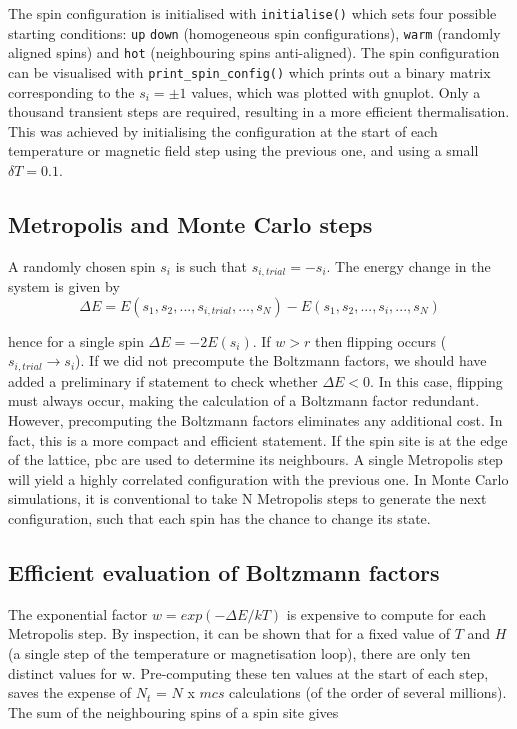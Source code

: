 \documentclass[a4paper]{article}
\begin{document}
The spin configuration is initialised with \verb;initialise(); which sets four possible starting conditions: \verb;up;  \verb;down; (homogeneous spin configurations), \verb;warm; (randomly aligned spins) and \verb;hot; (neighbouring spins anti-aligned). The spin configuration can be visualised with \verb;print_spin_config(); which prints out a binary matrix corresponding to the $s_i = \pm 1$ values, which was plotted with gnuplot. Only a thousand transient steps are required, resulting in a more efficient thermalisation. This was achieved by initialising the configuration at the start of each temperature or magnetic field step using the previous one, and using a small $\delta T = 0.1$.

\subsection{Metropolis and Monte Carlo steps }


A randomly chosen spin $s_i$ is such that $s_{i,trial} = -s_i$. The energy change in the system is given by
\begin{equation}
\Delta E = E(s_1, s_2,..., s_{i,trial}, ...,s_N) - E(s_1,s_2, ...,s_i, ..., s_N)
\end{equation}

hence for a single spin $\Delta E = -2E(s_i)$. If $w > r$ then flipping occurs ( $s_{i,trial} \rightarrow s_i$). If we did not precompute the Boltzmann factors, we should have added a preliminary if statement to check whether $\Delta E <0 $. In this case, flipping must always occur, making the calculation of a Boltzmann factor redundant. However, precomputing the Boltzmann factors eliminates any additional cost. In fact, this is a more compact and efficient statement. If the spin site is at the edge of the lattice, pbc are used to determine its neighbours. A single Metropolis step will yield a highly correlated configuration with the previous one. In Monte Carlo simulations, it is conventional to take N Metropolis steps to generate the next configuration, such that each spin has the chance to change its state. 
 
\subsection{Efficient evaluation of Boltzmann factors}

The exponential factor $w = exp(-\Delta E/kT)$ is expensive to compute for each Metropolis step. By inspection, it can be shown that for a fixed value of $T$ and $H$ (a single step of the temperature or magnetisation loop), there are only ten distinct values for w. Pre-computing these ten values at the start of each step, saves the expense of $N_t$ = $N$ x $mcs$ calculations (of the order of several millions). The sum of the neighbouring spins of a spin site gives 
\end{document}
